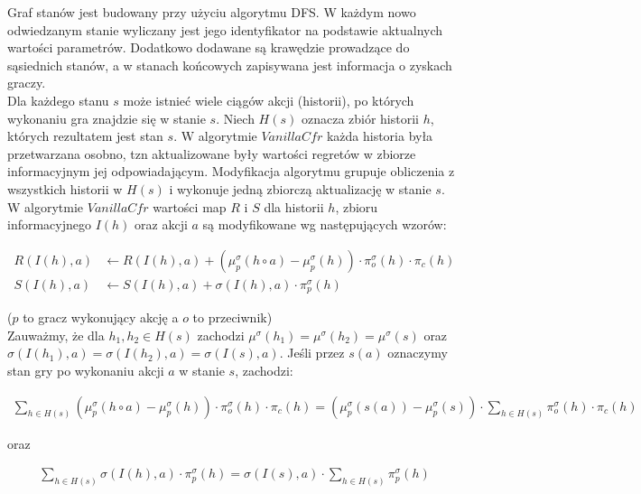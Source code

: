 \documentclass[licencjacka]{pracamgr}
\begin{document}
\noindent
Graf stanów jest budowany przy użyciu algorytmu DFS. W każdym nowo odwiedzanym stanie
wyliczany jest jego identyfikator na podstawie aktualnych wartości parametrów. Dodatkowo dodawane
są krawędzie prowadzące do sąsiednich stanów, a w stanach końcowych zapisywana jest informacja o
zyskach graczy. \\

\noindent
Dla każdego stanu $s$ może istnieć wiele ciągów akcji (historii), po których wykonaniu gra
znajdzie się w stanie $s$. Niech $H(s)$ oznacza zbiór historii $h$, których rezultatem jest stan $s$.
W algorytmie $VanillaCfr$ każda historia była przetwarzana osobno, tzn aktualizowane były wartości
regretów w zbiorze informacyjnym jej odpowiadającym. Modyfikacja algorytmu grupuje obliczenia z
wszystkich historii w $H(s)$ i wykonuje jedną zbiorczą aktualizację w stanie $s$. \\

\noindent
W algorytmie $VanillaCfr$ wartości map $R$ i $S$ dla historii $h$, zbioru informacyjnego $I(h)$ oraz akcji $a$ są modyfikowane
wg następujących wzorów:

\begin{align*}
R(I(h), a) &\leftarrow R(I(h), a) + (\mu_p^{\sigma}(h \circ a) - \mu_p^{\sigma}(h)) \cdot \pi_{o}^{\sigma}(h) \cdot \pi_c(h) \\
S(I(h), a) &\leftarrow S(I(h), a) + \sigma(I(h), a) \cdot \pi_p^{\sigma}(h)
\end{align*}

\noindent
($p$ to gracz wykonujący akcję a $o$ to przeciwnik) \\

\noindent
Zauważmy, że dla $h_1, h_2 \in H(s)$ zachodzi $\mu^{\sigma}(h_1) = \mu^{\sigma}(h_2) = \mu^{\sigma}(s)$ oraz
$\sigma(I(h_1), a) = \sigma(I(h_2), a) = \sigma(I(s), a). $
Jeśli przez $s(a)$ oznaczymy stan gry po wykonaniu akcji $a$ w stanie $s$, zachodzi: 

\begin{align*}
\sum\limits_{h \in H(s)} (\mu_p^{\sigma}(h \circ a) - \mu_p^{\sigma}(h)) \cdot \pi_o^{\sigma}(h) \cdot \pi_c(h) =
(\mu_p^{\sigma}(s(a)) - \mu_p^{\sigma}(s)) \cdot \sum\limits_{h \in H(s)} \pi_o^{\sigma}(h) \cdot \pi_c(h)
\end{align*}

\noindent
oraz

\begin{align*}
\sum\limits_{h \in H(s)} \sigma(I(h), a) \cdot \pi_p^{\sigma}(h) =
\sigma(I(s), a) \cdot \sum\limits_{h \in H(s)} \pi_p^{\sigma}(h)
\end{align*}
\end{document}
